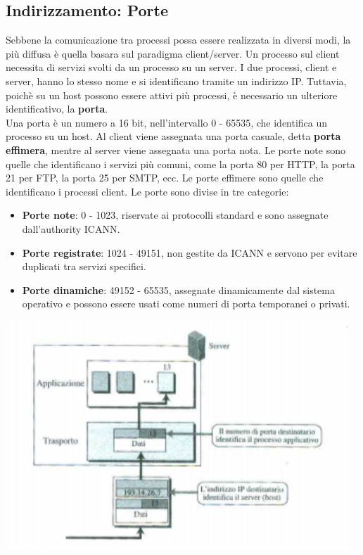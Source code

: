 \documentclass[12pt]{report}
\begin{document}
	\subsection{Indirizzamento: Porte}
	Sebbene la comunicazione tra processi possa essere realizzata in diversi modi, la più diffusa è quella basara sul paradigma client/server. Un processo sul client necessita di servizi svolti da un processo su un server. I due processi, client e server, hanno lo stesso nome e si identificano tramite un indirizzo IP. Tuttavia, poichè su un host possono essere attivi più processi, è necessario un ulteriore identificativo, la \textbf{porta}. 
	\vspace{\baselineskip}\\
	Una porta è un numero a 16 bit, nell'intervallo 0 - 65535, che identifica un processo su un host. Al client viene assegnata una porta casuale, detta \textbf{porta effimera}, mentre al server viene assegnata una porta nota. Le porte note sono quelle che identificano i servizi più comuni, come la porta 80 per HTTP, la porta 21 per FTP, la porta 25 per SMTP, ecc. Le porte effimere sono quelle che identificano i processi client. Le porte sono divise in tre categorie:
	\begin{itemize}
		\item \textbf{Porte note}: 0 - 1023, riservate ai protocolli standard e sono assegnate dall'authority ICANN.
		\item \textbf{Porte registrate}: 1024 - 49151, non gestite da ICANN e servono per evitare duplicati tra servizi specifici.
		\item \textbf{Porte dinamiche}: 49152 - 65535, assegnate dinamicamente dal sistema operativo e possono essere usati come numeri di porta temporanei o privati.
	\end{itemize}
	\begin{center}
		\includegraphics[scale=0.5]{assets/port.png}
	\end{center}
\end{document}
